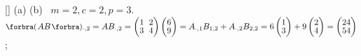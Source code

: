 [\Sbra]{
	(a) 
	(b) 
}\BulletPointX\Example \,\,\,$m=2,c=2,p=3.$\TextB{\vspace{2pt}}
$\BigPar{AB}{_{\cdot,2}}=AB_{\cdot, 2}=\begin{pmatrix} 1 &\hspace{-4pt} 2\\[-2pt] 3 &\hspace{-4pt} 4\end{pmatrix}\begin{pmatrix} 6 \\[-2pt] 9\end{pmatrix}=A_{\cdot,1}B_{1,2}+A_{\cdot,2}B_{2,2}=6\begin{pmatrix}1\\[-2pt]3\end{pmatrix}+9\begin{pmatrix}2\\[-2pt]4\end{pmatrix}=\begin{pmatrix} 24\\[-2pt] 54\end{pmatrix}$;\TextB{\vspace{2pt}}
